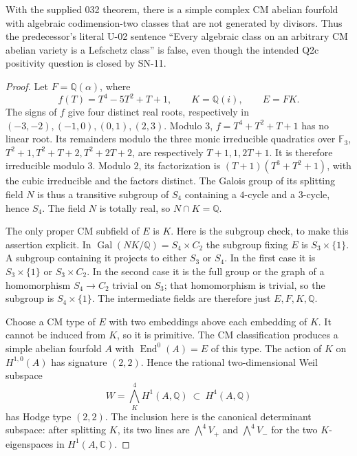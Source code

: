 \begin{proposition}
With the supplied 032 theorem, there is a simple complex CM abelian
fourfold with algebraic codimension-two classes that are not generated by
divisors.  Thus the predecessor's literal U-02 sentence
``Every algebraic class on an arbitrary CM abelian variety is a Lefschetz
class'' is false, even though the intended Q2c positivity question is
closed by SN-11.
\end{proposition}
\begin{proof}
Let $F=\mathbb Q(\alpha)$, where
\[
 f(T)=T^4-5T^2+T+1,\qquad K=\mathbb Q(i),\qquad E=FK.
\]
The signs of $f$ give four distinct real roots, respectively in
$(-3,-2),(-1,0),(0,1),(2,3)$.
Modulo $3$, $f=T^4+T^2+T+1$ has no linear root.  Its remainders modulo the
three monic irreducible quadratics over $\mathbb F_3$,
$T^2+1,T^2+T+2,T^2+2T+2$, are respectively
$T+1,1,2T+1$.  It is therefore irreducible modulo $3$.
Modulo $2$, its factorization is
$(T+1)(T^3+T^2+1)$, with the cubic irreducible and the factors distinct.
The Galois group of its splitting field $N$ is thus a transitive subgroup
of $S_4$ containing a $4$-cycle and a $3$-cycle, hence $S_4$.
The field $N$ is totally real, so $N\cap K=\mathbb Q$.

The only proper CM subfield of $E$ is $K$.  Here is the subgroup check,
to make this assertion explicit.  In
$\operatorname{Gal}(NK/\mathbb Q)=S_4\times C_2$ the subgroup fixing $E$
is $S_3\times\{1\}$.  A subgroup containing it projects to either $S_3$
or $S_4$.  In the first case it is $S_3\times\{1\}$ or $S_3\times C_2$.
In the second case it is the full group or the graph of a homomorphism
$S_4\to C_2$ trivial on $S_3$; that homomorphism is trivial, so the subgroup
is $S_4\times\{1\}$.  The intermediate fields are therefore just
$E,F,K,\mathbb Q$.

Choose a CM type of $E$ with two embeddings above each embedding of $K$.
It cannot be induced from $K$, so it is primitive.  The CM classification
\cite[Propositions~3.12--3.13]{MilneCM} produces a simple abelian fourfold
$A$ with $\operatorname{End}^0(A)=E$ of this type.  The action of $K$ on
$H^{1,0}(A)$ has signature $(2,2)$.  Hence the rational two-dimensional
Weil subspace
\[
 W=\bigwedge_K^4 H^1(A,\mathbb Q)\ \subset\ H^4(A,\mathbb Q)
\]
has Hodge type $(2,2)$.  The inclusion here is the canonical determinant
subspace: after splitting $K$, its two lines are
$\bigwedge^4 V_+$ and $\bigwedge^4 V_-$ for the two $K$-eigenspaces in
$H^1(A,\mathbb C)$.


\end{proof}
